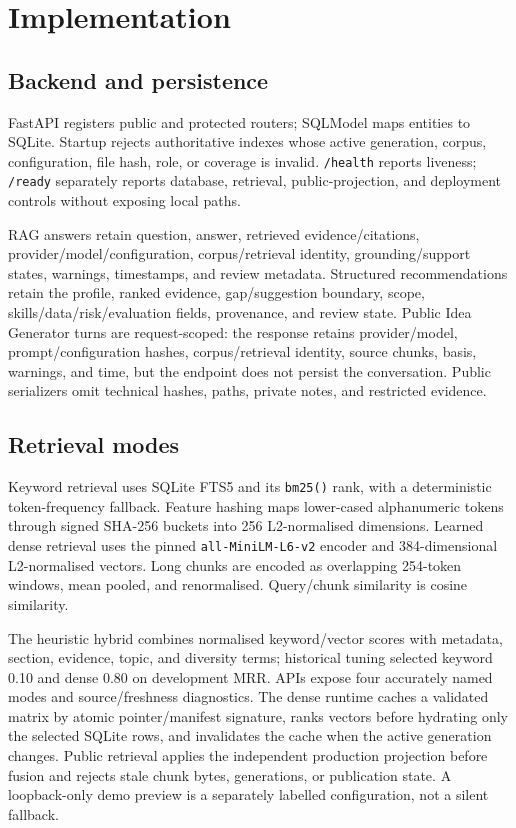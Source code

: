 \chapter{Implementation}
\label{ch:implementation}

\section{Backend and persistence}

FastAPI registers public and protected routers; SQLModel maps entities to SQLite. Startup rejects authoritative indexes whose active generation, corpus, configuration, file hash, role, or coverage is invalid. \texttt{/health} reports liveness; \texttt{/ready} separately reports database, retrieval, public-projection, and deployment controls without exposing local paths.

RAG answers retain question, answer, retrieved evidence/citations, provider/model/configuration, corpus/retrieval identity, grounding/support states, warnings, timestamps, and review metadata. Structured recommendations retain the profile, ranked evidence, gap/suggestion boundary, scope, skills/data/risk/evaluation fields, provenance, and review state. Public Idea Generator turns are request-scoped: the response retains provider/model, prompt/configuration hashes, corpus/retrieval identity, source chunks, basis, warnings, and time, but the endpoint does not persist the conversation. Public serializers omit technical hashes, paths, private notes, and restricted evidence.

\section{Retrieval modes}

Keyword retrieval uses SQLite FTS5 and its \texttt{bm25()} rank, with a deterministic token-frequency fallback. Feature hashing maps lower-cased alphanumeric tokens through signed SHA-256 buckets into 256 L2-normalised dimensions. Learned dense retrieval uses the pinned \texttt{all-MiniLM-L6-v2} encoder and 384-dimensional L2-normalised vectors. Long chunks are encoded as overlapping 254-token windows, mean pooled, and renormalised. Query/chunk similarity is cosine similarity.

The heuristic hybrid combines normalised keyword/vector scores with metadata, section, evidence, topic, and diversity terms; historical tuning selected keyword 0.10 and dense 0.80 on development MRR. APIs expose four accurately named modes and source/freshness diagnostics. The dense runtime caches a validated matrix by atomic pointer/manifest signature, ranks vectors before hydrating only the selected SQLite rows, and invalidates the cache when the active generation changes. Public retrieval applies the independent production projection before fusion and rejects stale chunk bytes, generations, or publication state. A loopback-only demo preview is a separately labelled configuration, not a silent fallback.

